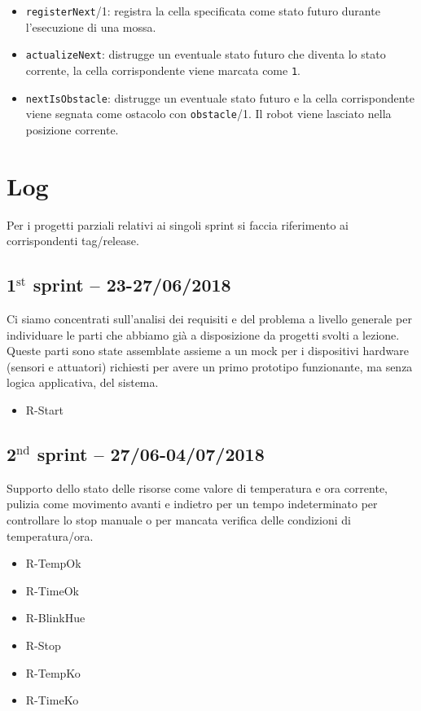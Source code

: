 \begin{itemize}
	\item \texttt{registerNext}/1: registra la cella specificata come stato futuro durante l'esecuzione di una mossa.
	\item \texttt{actualizeNext}: distrugge un eventuale stato futuro che diventa lo stato corrente, la cella corrispondente viene marcata come \texttt{1}.
	\item \texttt{nextIsObstacle}: distrugge un eventuale stato futuro e la cella corrispondente viene segnata come ostacolo con \texttt{obstacle}/1. Il robot viene lasciato nella posizione corrente.
\end{itemize}

\section{Log}

Per i progetti parziali relativi ai singoli sprint si faccia riferimento ai corrispondenti tag/release.

\subsection{1$^{\textrm{st}}$ sprint -- 23-27/06/2018}
Ci siamo concentrati sull'analisi dei requisiti e del problema a livello generale per individuare le parti che abbiamo già a disposizione da progetti svolti a lezione. Queste parti sono state assemblate assieme a un mock per i dispositivi hardware (sensori e attuatori) richiesti per avere un primo prototipo funzionante, ma senza logica applicativa, del sistema.

\begin{itemize}
	\ttfamily
	\item R-Start
\end{itemize}

\subsection{2$^{\textrm{nd}}$ sprint -- 27/06-04/07/2018}
Supporto dello stato delle risorse come valore di temperatura e ora corrente, pulizia come movimento avanti e indietro per un tempo indeterminato per controllare lo stop manuale o per mancata verifica delle condizioni di temperatura/ora.

\begin{itemize}
	\ttfamily
	\item R-TempOk
	\item R-TimeOk
	\item R-BlinkHue
	\item R-Stop
	\item R-TempKo
	\item R-TimeKo
\end{itemize}

